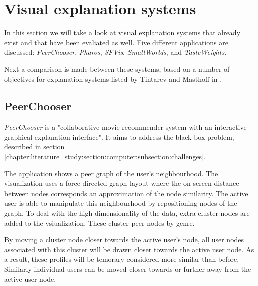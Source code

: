 % 
\section{Visual explanation systems}\label{chapter:literature_study:section:applications}

In this section we will take a look at visual explanation systems that already exist and that have been evaliated as well. Five different applications are discussed: \emph{PeerChooser}, \emph{Pharos}, \emph{SFVis}, \emph{SmallWorlds}, and \emph{TasteWeights}.

Next a comparison is made between these systems, based on a number of objectives for explanation systems listed by Tintarev and Masthoff in \cite{tintarev:2007:SER:1547550.1547664}.



\subsection{PeerChooser}\label{chapter:survey:section:applications:subsection:peerchooser}

\emph{PeerChooser} is a "collaborative movie recommender system with an interactive graphical explanation interface"\cite{odonovan:2008}. It aims to address the black box problem, described in section \ref{chapter:literature_study:section:computer:subsection:challenges}\cite{odonovan:2008}.

The application shows a peer graph of the user's neighbourhood. The visualization uses a force-directed graph layout where the on-screen distance between nodes corresponds an approximation of the node similarity. The active user is able to manipulate this neighbourhood by repositioning nodes of the graph. To deal with the high dimensionality of the data, extra cluster nodes are added to the vsiualization. These cluster peer nodes by genre\cite{odonovan:2008}.

By moving a cluster node closer towards the active user's node, all user nodes associated with this cluster will be drawn closer towards the active user node. As a result, these profiles will be temorary considered more similar than before. Similarly individual users can be moved closer towards or further away from the active user node\cite{odonovan:2008}.

